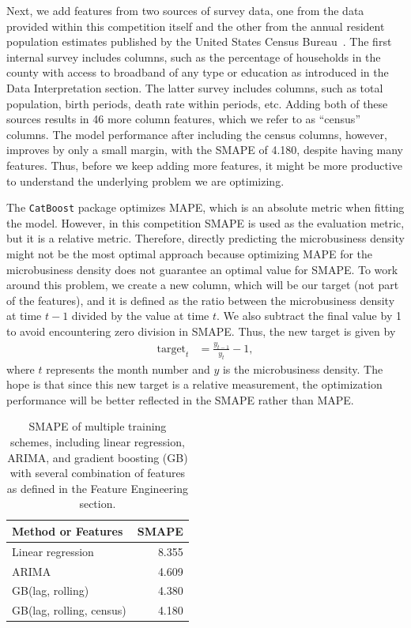 \documentclass[prl,aps,superscriptaddress,twocolumn,10pt,nolongbibliography]{revtex4-2}
\begin{document}
Next, we add features from two sources of survey data, one from the data provided within this competition itself and the other from the annual resident population estimates published by the United States Census Bureau~\cite{uscensus}.
The first internal survey includes columns, such as the percentage of households in the county with access to broadband of any type or education as introduced in the Data Interpretation section.
The latter survey includes columns, such as total population, birth periods, death rate within periods, etc. 
Adding both of these sources results in 46 more column features, which we refer to as ``census'' columns.
The model performance after including the census columns, however, improves by only a small margin, with the SMAPE of 4.180, despite having many features. 
Thus, before we keep adding more features, it might be more productive to understand the underlying problem we are optimizing. 

The \lstinline{CatBoost} package optimizes MAPE, which is an absolute metric when fitting the model. 
However, in this competition SMAPE is used as the evaluation metric, but it is a relative metric. 
Therefore, directly predicting the microbusiness density might not be the most optimal approach because optimizing MAPE for the microbusiness density does not guarantee an optimal value for SMAPE. 
To work around this problem, we create a new column, which will be our target (not part of the features), and it is defined as the ratio between the microbusiness density at time $t-1$ divided by the value at time $t$. 
We also subtract the final value by 1 to avoid encountering zero division in SMAPE. 
Thus, the new target is given by
\begin{align}
\textrm{target}_t &= \frac{y_{t-1}}{y_t} - 1,   
\end{align}
where $t$ represents the month number and $y$ is the microbusiness density. 
The hope is that since this new target is a relative measurement, the optimization performance will be better reflected in the SMAPE rather than MAPE.

\begin{table}
    \caption{
    SMAPE of multiple training schemes, including linear regression, ARIMA, and gradient boosting (GB) with several combination of features as defined in the Feature Engineering section.
    }
    \label{tab:smape}
    \begin{ruledtabular}
    \begin{tabular}{lr}
    Method or Features & SMAPE \\
    \hline
    Linear regression & 8.355 \\
    ARIMA & 4.609 \\
    GB(lag, rolling) & 4.380 \\
    GB(lag, rolling, census) & 4.180 \\
\end{tabular}
\end{ruledtabular}
\end{table}
\end{document}
